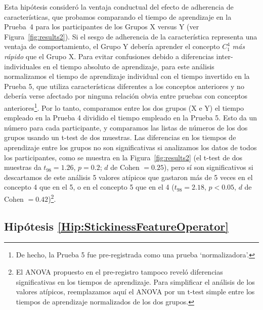 Esta hipótesis consideró la ventaja conductual del efecto de adherencia de características, que probamos comparando el tiempo de aprendizaje en la Prueba~4 para los participantes de los Grupos X versus Y (ver Figura~\ref{fig:results2}). Si el sesgo de adherencia de la característica representa una ventaja de comportamiento, el Grupo Y debería aprender el concepto $ C^4_1 $ \emph{más rápido} que el Grupo X. Para evitar confusiones debido a diferencias inter-individuales en el tiempo absoluto de aprendizaje, para este análisis normalizamos el tiempo de aprendizaje individual con el tiempo invertido en la Prueba 5, que utiliza características diferentes a los conceptos anteriores y no debería verse afectado por ninguna relación obvia entre pruebas con conceptos anteriores\footnote{De hecho, la Prueba 5 fue pre-registrada como una prueba `normalizadora'.}. Por lo tanto, comparamos entre los dos grupos (X e Y) el tiempo empleado en la Prueba 4 dividido el tiempo empleado en la Prueba 5. Esto da un número para cada participante, y comparamos las listas de números de los dos grupos usando un t-test de dos muestras. Las diferencias en los tiempos de aprendizaje entre los grupos no son significativas si analizamos los datos de todos los participantes, como se muestra en la Figura~\ref{fig:results2} (el t-test de dos muestras da $ t_{98} = 1.26 $, $ p = 0.2 $; $d$ de Cohen $= 0.25 $), pero sí son significativos si descartamos de este análisis 5 valores atípicos que gastaron más de 5 veces en el concepto 4 que en el 5, o en el concepto 5 que en el 4 ($ t_{98} = 2.18 $, $ p < 0.05 $, $ d$ de Cohen $= 0.42 $)\footnote{El ANOVA propuesto en el pre-registro tampoco reveló diferencias significativas en los tiempos de aprendizaje. Para simplificar el análisis de los valores atípicos, reemplazamos aquí el ANOVA por un t-test simple entre los tiempos de aprendizaje normalizados de los dos grupos.}.



\subsection{Hipótesis \ref{Hip:StickinessFeatureOperator}} \label{Results:StickinessFeatureOperator} 


